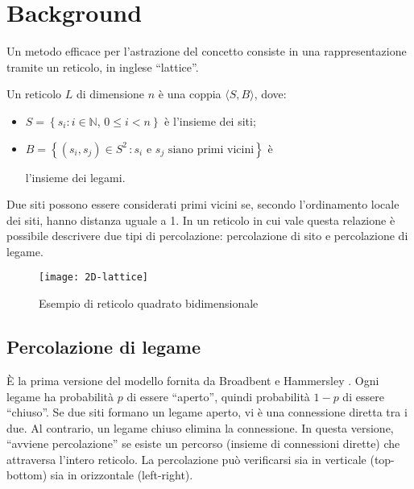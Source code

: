\section{Background}
\label{sec:background}

Un metodo efficace per l'astrazione del concetto consiste 
in una rappresentazione tramite un reticolo, in inglese ``lattice''.


\begin{definition}[Reticolo]
    Un reticolo $L$ di dimensione $n$ è una coppia $\langle S, B \rangle$, dove:
    \begin{itemize}
        \item $S = \left\{ s_i : i \in \mathbb{N} , \, 0 \leq i < n \right\}$ è l'insieme dei siti;
        \item $B = \left\{ (s_i, s_j) \in S^2 \, : \text{$s_i$ e $s_j$ siano primi vicini} \right\}$ è 
        
        l'insieme dei legami.
    \end{itemize}
\end{definition}
Due siti possono essere considerati primi vicini se, secondo l'ordinamento locale dei siti, hanno 
distanza uguale a 1.
In un reticolo in cui vale questa relazione è possibile descrivere due tipi di percolazione: 
percolazione di sito e percolazione di legame.

\begin{figure}
    \centering
    \texttt{[image: 2D-lattice]}
    \caption{Esempio di reticolo quadrato bidimensionale}
    \label{fig:ex-lattice}
\end{figure}

\subsection*{Percolazione di legame}
È la prima versione del modello fornita da Broadbent e Hammersley \cite{broadbent}.
Ogni legame ha probabilità $p$ di essere ``aperto'', quindi
probabilità $1-p$ di essere ``chiuso''. Se due siti formano un legame aperto, vi è una
connessione diretta tra i due. Al contrario, un legame chiuso elimina la connessione.
In questa versione, ``avviene percolazione'' se esiste un percorso (insieme di connessioni dirette) 
che attraversa l'intero reticolo. La percolazione può verificarsi 
sia in verticale (top-bottom) sia in orizzontale (left-right).

